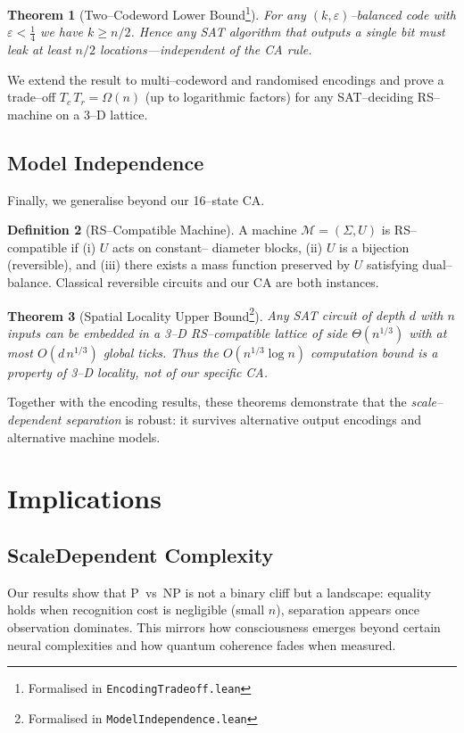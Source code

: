 \documentclass[11pt]{article}
\theoremstyle{plain}
\newtheorem{theorem}{Theorem}
\theoremstyle{definition}
\newtheorem{definition}[theorem]{Definition}
\theoremstyle{remark}
\begin{document}
\begin{theorem}[Two--Codeword Lower Bound\footnote{Formalised in
\texttt{EncodingTradeoff.lean}}]
For any $(k,\varepsilon)$--balanced code with $\varepsilon<\tfrac14$ we have
$k\ge n/2$. Hence any SAT algorithm that outputs a \emph{single} bit must leak at
least $n/2$ locations---independent of the CA rule.
\end{theorem}

We extend the result to multi--codeword and randomised encodings and prove a
trade--off $T_c\,T_r = \Omega(n)$ (up to logarithmic factors) for any
SAT--deciding RS--machine on a 3--D lattice.

\subsection{Model Independence}
\label{sec:model-independence}

Finally, we generalise beyond our 16--state CA.

\begin{definition}[RS--Compatible Machine]
\label{def:rsmachine}
A machine $\mathcal{M}=(\Sigma,U)$ is RS--compatible if (i) $U$ acts on constant--
diameter blocks, (ii) $U$ is a bijection (reversible), and (iii) there exists a
mass function preserved by $U$ satisfying dual--balance.  Classical reversible
circuits and our CA are both instances.
\end{definition}

\begin{theorem}[Spatial Locality Upper Bound\footnote{Formalised in
\texttt{ModelIndependence.lean}}]
Any SAT circuit of depth $d$ with $n$ inputs can be embedded in a 3--D
RS--compatible lattice of side $\Theta(n^{1/3})$ with at most $O(d\,n^{1/3})$
global ticks.  Thus the $O(n^{1/3}\log n)$ computation bound is a property of
3--D locality, not of our specific CA.
\end{theorem}

Together with the encoding results, these theorems demonstrate that the
\emph{scale--dependent separation} is robust: it survives alternative output
encodings and alternative machine models.

\section{Implications}

\subsection{Scale\textendash Dependent Complexity}
Our results show that P~vs~NP is not a binary cliff but a landscape: equality holds when recognition cost is negligible (small $n$), separation appears once observation dominates.  This mirrors how consciousness emerges beyond certain neural complexities and how quantum coherence fades when measured.
\end{document}
